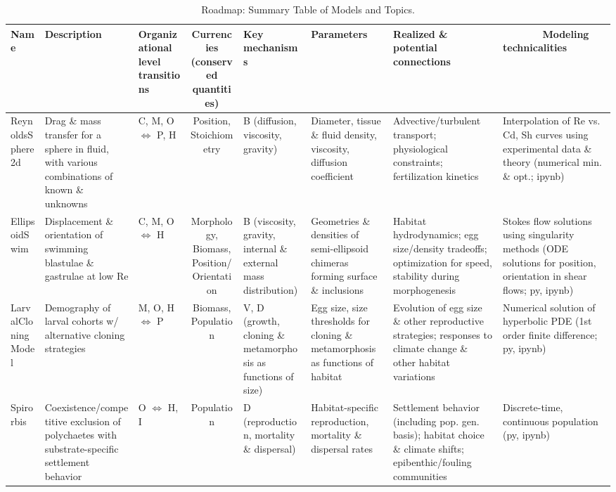\documentclass[10pt,legalpaper]{article}
\begin{document}
	
\begin{sidewaystable}
	\centering
	\caption{Roadmap: Summary Table of Models and Topics.} \label{tab:rmap}
	\vspace{.25cm}
	\small
	\begin{tabular}{|l|L|I|S|I|I|I|I|}
		\hline
		Name & \centering Description & \centering Organizational level transitions & Currencies (conserved quantities) & \centering Key mechanisms & \centering Parameters & \centering Realized \& potential connections & ~~~~~~~Modeling technicalities \\
		\hline
		ReynoldsSphere2d & Drag \& mass transfer for a sphere in fluid, with various combinations of known \& unknowns & C, M, O $\Leftrightarrow$ P, H & Position, Stoichiometry & B (diffusion, viscosity, gravity) & Diameter, tissue \& fluid density, viscosity, diffusion coefficient & Advective/turbulent transport; physiological constraints; fertilization kinetics & Interpolation of Re vs. Cd, Sh curves using experimental data \& theory (numerical min. \& opt.; ipynb) \\
		
		EllipsoidSwim & Displacement \& orientation of swimming blastulae \& gastrulae at low Re & C, M, O $\Leftrightarrow$ H & Morphology, Biomass, Position/Orientation & B (viscosity, gravity, internal \& external mass distribution) & Geometries \& densities of semi-ellipsoid chimeras forming surface \& inclusions & Habitat hydrodynamics; egg size/density tradeoffs; optimization for speed, stability during morphogenesis & Stokes flow solutions using singularity methods (ODE solutions for position, orientation in shear flows; py, ipynb) \\
		
		LarvalCloningModel & Demography of larval cohorts w/ alternative cloning strategies & M, O, H $\Leftrightarrow$ P & Biomass, Population & V, D (growth, cloning \& metamorphosis as functions of size) & Egg size, size thresholds for cloning \& metamorphosis as functions of habitat & Evolution of egg size \& other reproductive strategies; responses to climate change \& other habitat variations & Numerical solution of hyperbolic PDE (1st order finite difference; py, ipynb) \\
		
		Spirorbis & Coexistence/competitive exclusion of polychaetes with substrate-specific settlement behavior  & O $\Leftrightarrow$ H, I & Population & D (reproduction, mortality \& dispersal) & Habitat-specific reproduction, mortality \& dispersal rates & Settlement behavior (including pop. gen. basis); habitat choice \& climate shifts; epibenthic/fouling communities & Discrete-time, continuous population (py, ipynb) \\
		

\end{tabular}
\end{sidewaystable}
\end{document}
